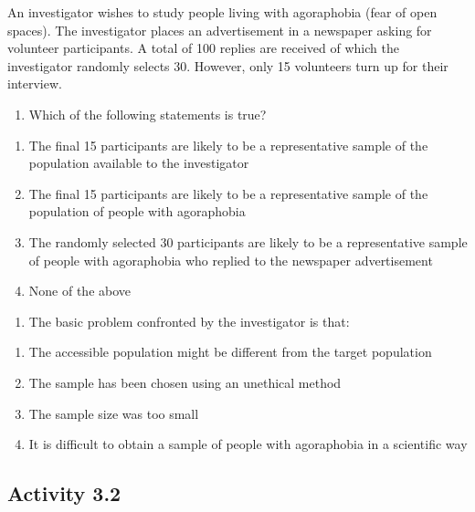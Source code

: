 \documentclass[
]{memoir}
\providecommand{\tightlist}{%
  \setlength{\itemsep}{0pt}\setlength{\parskip}{0pt}}
\begin{document}
An investigator wishes to study people living with agoraphobia (fear of open spaces). The investigator places an advertisement in a newspaper asking for volunteer participants. A total of 100 replies are received of which the investigator randomly selects 30. However, only 15 volunteers turn up for their interview.

\begin{enumerate}
\def\labelenumi{\arabic{enumi}.}
\tightlist
\item
  Which of the following statements is true?
\end{enumerate}

\begin{enumerate}
\def\labelenumi{\alph{enumi})}
\tightlist
\item
  The final 15 participants are likely to be a representative sample of the population available to the investigator
\item
  The final 15 participants are likely to be a representative sample of the population of people with agoraphobia
\item
  The randomly selected 30 participants are likely to be a representative sample of people with agoraphobia who replied to the newspaper advertisement
\item
  None of the above
\end{enumerate}

\begin{enumerate}
\def\labelenumi{\arabic{enumi}.}
\setcounter{enumi}{1}
\tightlist
\item
  The basic problem confronted by the investigator is that:
\end{enumerate}

\begin{enumerate}
\def\labelenumi{\alph{enumi})}
\tightlist
\item
  The accessible population might be different from the target population
\item
  The sample has been chosen using an unethical method
\item
  The sample size was too small
\item
  It is difficult to obtain a sample of people with agoraphobia in a scientific way
\end{enumerate}

\hypertarget{activity-3.2}{%
\subsection*{Activity 3.2}\label{activity-3.2}}
\end{document}
